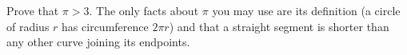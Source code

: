 Prove that $\pi>3$. The only facts about $\pi$ you may use are its definition (a circle of radius $r$ has circumference $2\pi r$) and that a straight segment is shorter than any other curve joining its endpoints.
